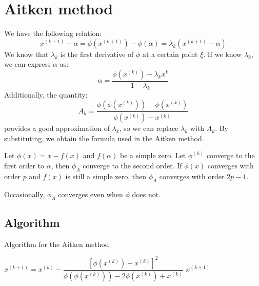 \section{Aitken method}

We have the following relation:
\[x^{(k+1)}-\alpha=\phi(x^{(k+1)})-\phi(\alpha)=\lambda_k\left( x^{(k+1)}-\alpha \right)\]
We know that $\lambda_k$ is the first derivative of $\phi$ at a certain point $\xi$. 
If we know $\lambda_k$, we can express $\alpha$ as: 
\[\alpha=\dfrac{\phi(x^{(k)})-\lambda_k x^{k}}{1-\lambda_k}\]
Additionally, the quantity:
\[A_k=\dfrac{\phi(\phi(x^{(k)}))-\phi(x^{(k)})}{\phi(x^{(k)})-x^{(k)}}\]
provides a good approximation of $\lambda_k$, so we can replace $\lambda_k$ with $A_k$. 
By substituting, we obtain the formula used in the Aitken method.
\begin{theorem}
    Let $\phi(x)=x-f(x)$ and $f(\alpha)$ be a simple zero. 
    Let $\phi^{(k)}$ converge to the first order to $\alpha$, then $\phi_A$ converge to the second order. 
    If $\phi(x)$ converges with order $p$ and $f(x)$ is still a simple zero, then $\phi_A$ converges with order $2p-1$. 
\end{theorem}
Occasionally, $\phi_A$ converges even when $\phi$ does not.

\subsection*{Algorithm}
\begin{algorithm}[H]
    \caption{Algorithm for the Aitken method}
        \begin{algorithmic}[1]
                \State $x^{(k+1)}=x^{(k)}-\dfrac{\left[ \phi(x^{(k)})-x^{(k)} \right]^2}{\phi(\phi(x^{(k)}))-2\phi(x^{(k)})+x^{(k)}}$
                    \State \Return $x^{(k+1)}$
                \EndIf
            \EndFor
        \end{algorithmic}
\end{algorithm}